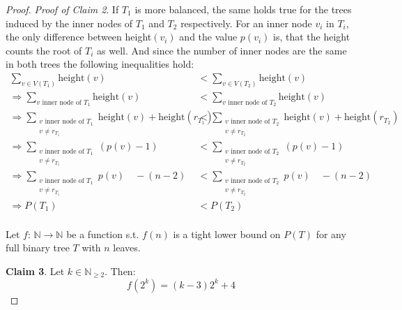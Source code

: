 \begin{proof}
\textit{Proof of Claim 2}. If $T_1$ is more balanced, the same holds true for the trees induced by the inner nodes of $T_1$ and $T_2$ respectively. For an inner node $v_i$ in $T_i$, the only difference between height$(v_i)$ and the value $p(v_i)$ is, that the height counts the root of $T_i$ as well. And since the number of inner nodes are the same in both trees the following inequalities hold:
\begin{align*}
\sum_{v \in V(T_1)} \text{height}(v) &< \sum_{v \in V(T_2)} \text{height}(v)\\
\Rightarrow \sum_{v \text{ inner node of }T_1} \text{height}(v) &< \sum_{v \text{ inner node of }T_2} \text{height}(v)\\
\Rightarrow \sum_{\substack{v \text{ inner node of }T_1 \\ v \neq r_{T_1}}} \text{height}(v) + \text{height}(r_{T_1}) &< \sum_{\substack{v \text{ inner node of }T_2 \\ v \neq r_{T_2}}} \text{height}(v) + \text{height}(r_{T_2}) \\
\Rightarrow \sum_{\substack{v \text{ inner node of }T_1 \\ v \neq r_{T_1}}} (p(v)-1) &< \sum_{\substack{v \text{ inner node of }T_2 \\ v \neq r_{T_2}}} (p(v)-1)\\
\Rightarrow \sum_{\substack{v \text{ inner node of }T_1 \\ v \neq r_{T_1}}} p(v) \quad -(n-2) &< \sum_{\substack{v \text{ inner node of }T_2 \\ v \neq r_{T_2}}} p(v) \quad -(n-2)\\
\Rightarrow P(T_1) &< P(T_2) \\
\end{align*}

Let $f: \, \mathbb{N} \to \mathbb{N}$ be a function s.t. $f(n)$ is a tight lower bound on $P(T)$ for any full binary tree $T$ with $n$ leaves.

\textbf{Claim 3}. Let $k \in \mathbb{N}_{\geq 2}$. Then:
$$f(2^k) = (k-3)2^k + 4$$


\end{proof}
